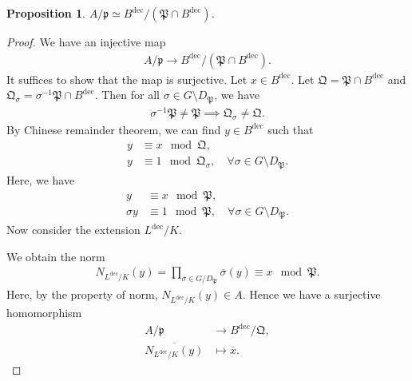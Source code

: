 \documentclass[12pt]{article}
\theoremstyle{plain}
\newtheorem{proposition}[theorem]{Proposition}
\theoremstyle{remark}
\theoremstyle{definition}
\begin{document}
\begin{proposition}
    $A/\mathfrak{p}\simeq B^\mathrm{dec}/(\mathfrak{P}\cap B^\mathrm{dec})$.
\end{proposition}
\begin{proof}
    We have an injective map
    \begin{align*}
        A/\mathfrak{p} \to B^\mathrm{dec}/(\mathfrak{P}\cap B^\mathrm{dec}).
    \end{align*}
    It suffices to show that the map is surjective. Let $x\in B^\mathrm{dec}$. Let $\mathfrak{Q}=\mathfrak{P}\cap B^\mathrm{dec}$ and $\mathfrak{Q}_\sigma=\sigma^{-1}\mathfrak{P}\cap B^\mathrm{dec}$. Then for all $\sigma\in G\setminus D_\mathfrak{P}$, we have
    \begin{align*}
        \sigma^{-1}\mathfrak{P}\neq \mathfrak{P} \implies \mathfrak{Q}_\sigma \neq \mathfrak{Q}.
    \end{align*}
    By Chinese remainder theorem, we can find $y\in B^\mathrm{dec}$ such that
    \begin{align*}
        y&\equiv x\mod \mathfrak{Q}, \\
        y&\equiv 1\mod \mathfrak{Q}_{\sigma},\quad \forall \sigma\in G\setminus D_\mathfrak{P}.
    \end{align*}
    Here, we have
    \begin{align*}
        y&\equiv x\mod \mathfrak{P}, \\
        \sigma y&\equiv 1\mod \mathfrak{P},\quad \forall \sigma\in G\setminus D_\mathfrak{P}. 
    \end{align*}
    Now consider the extension $L^\mathrm{dec}/K$.
    \begin{figure}[H]
        \centering
    \end{figure}
    \noindent We obtain the norm
    \begin{align*}
        N_{L^\mathrm{dec}/K}(y) = \prod_{\overline{\sigma}\in G/D_\mathfrak{P}} \overline{\sigma}(y) \equiv x\mod \mathfrak{P}.
    \end{align*}
    Here, by the property of norm, $N_{L^\mathrm{dec}/K}(y)\in A$. Hence we have a surjective homomorphism
    \begin{align*}
        A/\mathfrak{p} &\to B^\mathrm{dec}/\mathfrak{Q}, \\
        \overline{N_{L^\mathrm{dec}/K}(y)} &\mapsto \overline{x}.
    \end{align*}
\end{proof}
\end{document}
